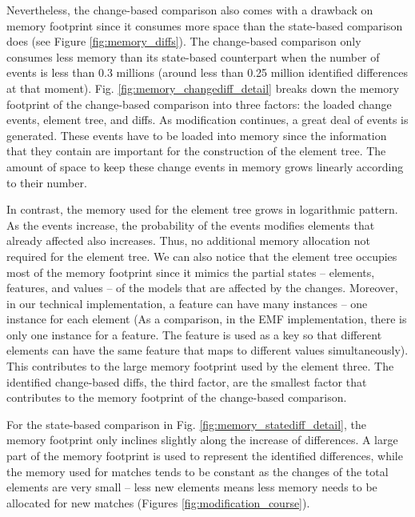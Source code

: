 \documentclass{jot}
\begin{document}
Nevertheless, the change-based comparison also comes with a drawback on memory footprint since it consumes more space than the state-based comparison does (see Figure \ref{fig:memory_diffs}). The change-based comparison only consumes less memory than its state-based counterpart when the number of events is less than 0.3 millions (around less than 0.25 million identified differences at that moment). Fig. \ref{fig:memory_changediff_detail} breaks down the memory footprint of the change-based comparison into three factors: the loaded change events, element tree, and diffs. As modification continues, a great deal of events is generated. These events have to be loaded into memory since the information that they contain are important for the construction of the element tree. The amount of space to keep these change events in memory grows linearly according to their number. 

In contrast, the memory used for the element tree grows in logarithmic pattern. As the events increase, the probability of the events modifies elements that already affected also increases. Thus, no additional memory allocation not required for the element tree. We can also notice that the element tree occupies most of the memory footprint since it mimics the partial states -- elements, features, and values -- of the models that are affected by the changes. Moreover, in our technical implementation, a feature can have many instances -- one instance for each element (As a comparison, in the EMF implementation, there is only one instance for a feature. The feature is used as a key so that different elements can have the same feature that maps to different values simultaneously). This contributes to the large memory footprint used by the element three. The identified change-based diffs, the third factor, are the smallest factor that contributes to the memory footprint of the change-based comparison. 

For the state-based comparison in Fig. \ref{fig:memory_statediff_detail}, the memory footprint only inclines slightly along the increase of differences. A large part of the memory footprint is used to represent the identified differences, while the memory used for matches tends to be constant as the changes of the total elements are very small -- less new elements means less memory needs to be allocated for new matches (Figures \ref{fig:modification_course}). 
\end{document}
